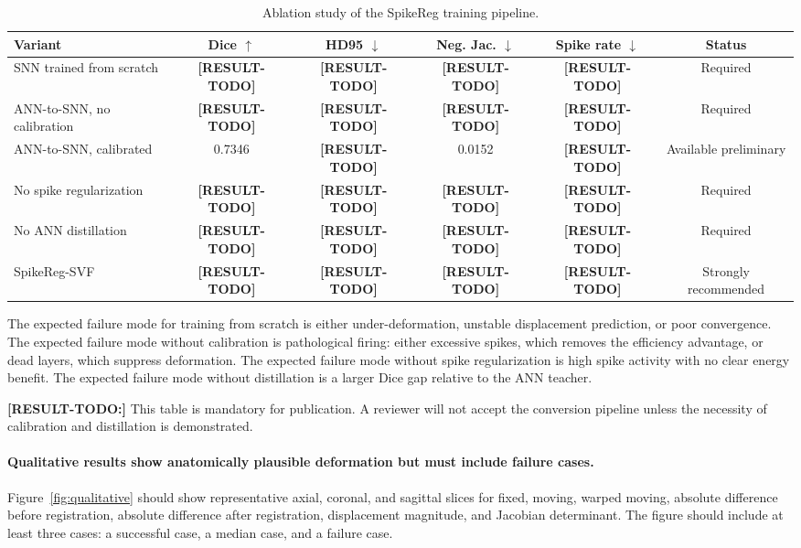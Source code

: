 \begin{table}[t]
\centering
\caption{
Ablation study of the SpikeReg training pipeline.
}
\label{tab:ablation}
\begin{tabular}{lccccc}
\hline
Variant & Dice $\uparrow$ & HD95 $\downarrow$ & Neg. Jac. $\downarrow$ & Spike rate $\downarrow$ & Status \\
\hline
SNN trained from scratch & \textbf{[RESULT-TODO]} & \textbf{[RESULT-TODO]} & \textbf{[RESULT-TODO]} & \textbf{[RESULT-TODO]} & Required \\
ANN-to-SNN, no calibration & \textbf{[RESULT-TODO]} & \textbf{[RESULT-TODO]} & \textbf{[RESULT-TODO]} & \textbf{[RESULT-TODO]} & Required \\
ANN-to-SNN, calibrated & 0.7346 & \textbf{[RESULT-TODO]} & 0.0152 & \textbf{[RESULT-TODO]} & Available preliminary \\
No spike regularization & \textbf{[RESULT-TODO]} & \textbf{[RESULT-TODO]} & \textbf{[RESULT-TODO]} & \textbf{[RESULT-TODO]} & Required \\
No ANN distillation & \textbf{[RESULT-TODO]} & \textbf{[RESULT-TODO]} & \textbf{[RESULT-TODO]} & \textbf{[RESULT-TODO]} & Required \\
SpikeReg-SVF & \textbf{[RESULT-TODO]} & \textbf{[RESULT-TODO]} & \textbf{[RESULT-TODO]} & \textbf{[RESULT-TODO]} & Strongly recommended \\
\hline
\end{tabular}
\end{table}

The expected failure mode for training from scratch is either under-deformation, unstable displacement prediction, or poor convergence. The expected failure mode without calibration is pathological firing: either excessive spikes, which removes the efficiency advantage, or dead layers, which suppress deformation. The expected failure mode without spike regularization is high spike activity with no clear energy benefit. The expected failure mode without distillation is a larger Dice gap relative to the ANN teacher.

\textbf{[RESULT-TODO:]} This table is mandatory for publication. A reviewer will not accept the conversion pipeline unless the necessity of calibration and distillation is demonstrated.


\paragraph{Qualitative results show anatomically plausible deformation but must include failure cases.}
Figure~\ref{fig:qualitative} should show representative axial, coronal, and sagittal slices for fixed, moving, warped moving, absolute difference before registration, absolute difference after registration, displacement magnitude, and Jacobian determinant. The figure should include at least three cases: a successful case, a median case, and a failure case.

